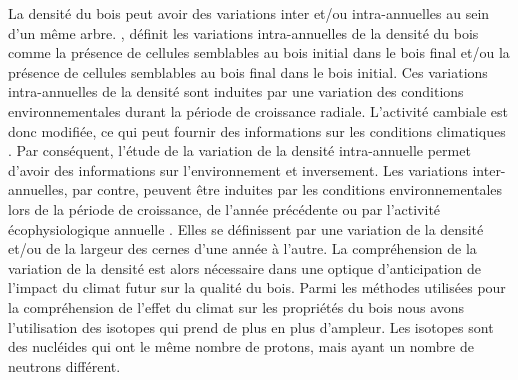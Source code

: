 \documentclass{report}
\begin{document}
La densité du bois peut avoir des variations inter et/ou intra-annuelles au sein d'un même arbre. \cite{Fritts2001}, définit les variations intra-annuelles de la densité du bois comme la présence de cellules semblables au bois initial dans le bois final et/ou la présence de cellules semblables au bois final dans le bois initial. Ces variations intra-annuelles de la densité sont induites par une variation des conditions environnementales durant la période de croissance radiale. L'activité cambiale est donc modifiée, ce qui peut fournir des informations sur les conditions climatiques \citep{Campeloa2007,Campelo2013,Novak2013}. Par conséquent, l'étude de la variation de la densité intra-annuelle permet d'avoir des informations sur l'environnement et inversement. Les variations inter-annuelles, par contre, peuvent être induites par les conditions environnementales lors de la période de croissance, de l'année précédente ou par l'activité écophysiologique annuelle \citep{Hughes1984,DArrigo1992}. Elles se définissent par une variation de la densité et/ou de la largeur des cernes d'une année à l'autre. La compréhension de la variation de la densité est alors nécessaire dans une optique d'anticipation de l'impact du climat futur sur la qualité du bois. Parmi les méthodes utilisées pour la compréhension de l'effet du climat sur les propriétés du bois nous avons l'utilisation des isotopes qui prend de plus en plus d'ampleur. Les isotopes sont des nucléides qui ont le même nombre de protons, mais ayant un nombre de neutrons différent.\\
\end{document}
